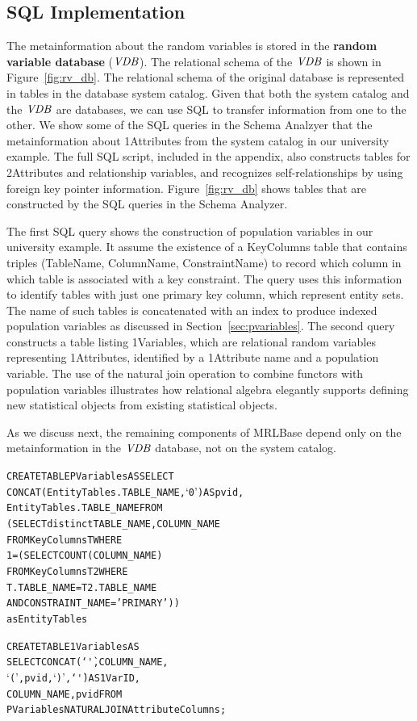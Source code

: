 \documentclass{acm_proc_article-sp}
\begin{document}
\subsection{SQL Implementation}
The metainformation about the random variables is stored in the \textbf{random variable database} ($\it{VDB}$). The relational schema of the $\it{VDB}$ is shown in Figure~\ref{fig:rv_db}. %
The relational schema of the original database is represented in tables in the database system catalog. Given that both the system catalog and the $\it{VDB}$ are databases, we can use SQL to transfer information from one to the other. %
We show some of the SQL queries in the Schema Analzyer that the metainformation about 1Attributes from the system catalog in our  university example. The full SQL script, included in the appendix, also constructs tables for 2Attributes and relationship variables, and recognizes self-relationships by using foreign key pointer information. Figure~\ref{fig:rv_db} shows tables that are constructed by the SQL queries in the Schema Analyzer.


The first SQL query shows the construction of population variables in our university example. It assume the existence of a KeyColumns table that contains triples (TableName, ColumnName, ConstraintName) to record which column in which table is associated with a key constraint. The query uses this
information to identify tables with just one primary key column, which represent entity sets. The name of such tables is concatenated with an index to produce indexed population variables as discussed in Section~\ref{sec:pvariables}. The second query constructs a table listing 1Variables, which are relational random variables representing 1Attributes, identified by a 1Attribute name and a population variable. The use of the natural join operation to combine functors with population variables illustrates how relational algebra elegantly supports defining new statistical objects from existing statistical objects.

As we discuss next, the remaining components of MRLBase depend only on the metainformation in the $\it{VDB}$ database, not on the system catalog.
\begin{alltt}
CREATE TABLE PVariables AS  SELECT 
CONCAT(EntityTables.TABLE_NAME, `0') AS pvid,
EntityTables.TABLE_NAME FROM
(SELECT distinct TABLE_NAME, COLUMN_NAME 
FROM   KeyColumns T WHERE
1 = (SELECT  COUNT(COLUMN_NAME)   
FROM   KeyColumns T2  WHERE     
T.TABLE_NAME = T2.TABLE_NAME
AND CONSTRAINT_NAME = 'PRIMARY')) 
as EntityTables 

CREATE TABLE 1Variables AS
SELECT CONCAT(`\`', COLUMN_NAME,
 `(', pvid, `)', `\`') AS 1VarID,
COLUMN_NAME,   pvid  FROM    
PVariables   NATURAL JOIN  AttributeColumns;
\end{alltt}
\end{document}
